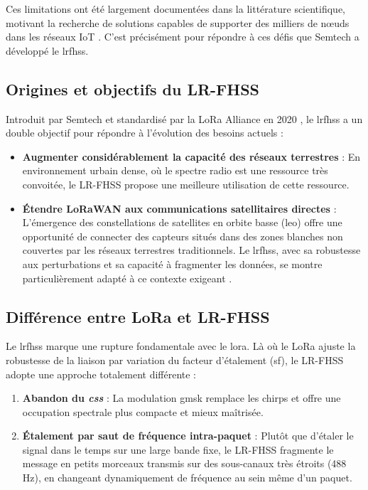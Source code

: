 Ces limitations ont été largement documentées dans la littérature scientifique, motivant la recherche de solutions capables de supporter des milliers de nœuds dans les réseaux IoT \cite{free}. C'est précisément pour répondre à ces défis que Semtech a développé le \gls{lrfhss}.

\subsection{Origines et objectifs du LR-FHSS}

Introduit par Semtech et standardisé par la LoRa Alliance en 2020 \cite{loraalliance2020regional}, le \gls{lrfhss} a un double objectif pour répondre à l'évolution des besoins actuels :

\begin{itemize}
	\item \textbf{Augmenter considérablement la capacité des réseaux terrestres} : En environnement urbain dense, où le spectre radio est une ressource très convoitée, le LR-FHSS propose une meilleure utilisation de cette ressource.
	
	\item \textbf{Étendre LoRaWAN aux communications satellitaires directes} : L'émergence des constellations de satellites en orbite basse (\gls{leo}) offre une opportunité de connecter des capteurs situés dans des zones blanches non couvertes par les réseaux terrestres traditionnels. Le \gls{lrfhss}, avec sa robustesse aux perturbations et sa capacité à fragmenter les données, se montre particulièrement adapté à ce contexte exigeant \cite{ieee_lr_fhss_2021, lr_fhss_dts}.
\end{itemize}

\subsection{Différence entre LoRa et LR-FHSS} 

Le \gls{lrfhss} marque une rupture fondamentale avec le \gls{lora}. Là où le LoRa ajuste la robustesse de la liaison par variation du facteur d'étalement (\gls{sf}), le LR-FHSS adopte une approche totalement différente :

\begin{enumerate}
	\item \textbf{Abandon du \textit{\gls{css}}} : La modulation \gls{gmsk} remplace les chirps et offre une occupation spectrale plus compacte et mieux maîtrisée.
	
	\item \textbf{Étalement par saut de fréquence intra-paquet} : Plutôt que d'étaler le signal dans le temps sur une large bande fixe, le LR-FHSS fragmente le message en petits morceaux transmis sur des sous-canaux très étroits (488 Hz), en changeant dynamiquement de fréquence au sein même d'un paquet.
\end{enumerate}

